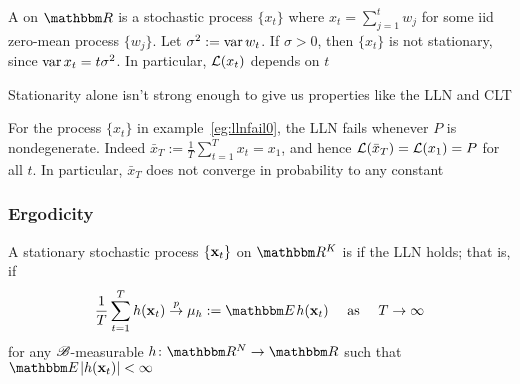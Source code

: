 \begin{frame}

    \vspace{2em}
    \Eg
    A  on $\RR$ is a stochastic process $\{x_t\}$ where $x_t
    = \sum_{j=1}^t w_j$ for some {\sc iid} zero-mean process $\{w_j\}$.
    Let $\sigma^2 := \operatorname{var} w_t$.  If $\sigma > 0$, then $\{x_t\}$ is not stationary, since $\operatorname{var} x_t = 
    t \sigma^2$.  In particular, $\mathcal L(x_t)$ depends on $t$
    
\end{frame}

\begin{frame}

    \vspace{2em}
    Stationarity alone isn't strong enough to give us properties like the LLN
    and CLT
    
    \vspace{1em}
    \Eg
    \label{eg:llnfail}
    For the process $\{x_t\}$ in example~\ref{eg:llnfail0},
    the LLN fails whenever $P$ is nondegenerate.  Indeed $\bar x_T :=
    \frac{1}{T} \sum_{t=1}^T x_t  = x_1$, and hence
    $\mathcal L(\bar x_T) = \mathcal L(x_1) = P$ for all $t$.  In particular, $\bar x_T$
    does not converge in probability to any constant
    

\end{frame}


\begin{frame}
    \frametitle{Ergodicity}

    \vspace{2em}
    A stationary stochastic process $\{{\mathbf x}_t\}$ on $\RR^K$ is
     if the LLN holds; that is, if
    \begin{equation}
        \label{eq:ergodic}
        \frac{1}{T} \sum_{t=1}^T h(\boldx_t) \toprob \mu_h := \EE h(\boldx_t) 
             \quad \text{ as } \quad T \to \infty
    \end{equation}
    for any $\mathscr B$-measurable $h \colon \RR^N \to \RR$ such that
    $\EE |h(\boldx_t)|  < \infty$
    
\end{frame}

